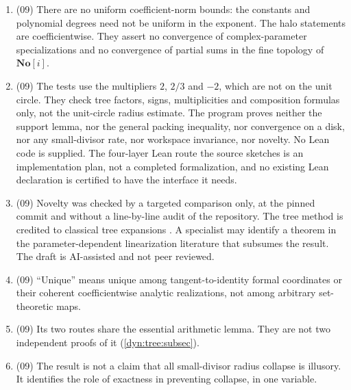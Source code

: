 \documentclass[11pt,letterpaper]{article}
\theoremstyle{definition}
\theoremstyle{remark}
\newcommand{\No}{\mathbf{No}}
\numberwithin{equation}{section}
\begin{document}
\begin{enumerate}[label=\textbf{N\arabic*.},ref=\textbf{N\arabic*},leftmargin=3.2em,start=81]
nonzero complex number is not justified; for a non-Bruno $\lambda$ it
produces a divergent linearizer.
\item (09) There are no uniform coefficient-norm bounds: the constants and
polynomial degrees need not be uniform in the exponent. The halo statements
are coefficientwise. They assert no convergence of complex-parameter
specializations and no convergence of partial sums in the fine topology of
$\No[i]$.
\item (09) The tests use the multipliers $2$, $2/3$ and $-2$, which are not
on the unit circle. They check tree factors, signs, multiplicities and
composition formulas only, not the unit-circle radius estimate. The program
proves neither the support lemma, nor the general packing inequality, nor
convergence on a disk, nor any small-divisor rate, nor workspace
invariance, nor novelty. No Lean code is supplied. The four-layer Lean route
the source sketches is an implementation plan, not a completed
formalization, and no existing Lean declaration is certified to have the
interface it needs.
\item\label{dyn:esm:nc:priority09} (09) Novelty was checked by a targeted
comparison only, at the pinned commit and without a line-by-line audit of
the repository. The tree method is credited to classical tree expansions
\cite{FauvetMenousSauzin,FMS26}. A specialist may identify a theorem in the
parameter-dependent linearization literature that subsumes the result. The
draft is AI-assisted and not peer reviewed.
\item (09) ``Unique'' means unique among tangent-to-identity formal
coordinates or their coherent coefficientwise analytic realizations, not
among arbitrary set-theoretic maps.
\item\label{dyn:esm:nc:routes} (09) Its two routes share the essential
arithmetic lemma. They are not two independent proofs of it
(\cref{dyn:tree:subsec}).
\item (09) The result is not a claim that all small-divisor radius collapse
is illusory. It identifies the role of exactness in preventing collapse, in
one variable.
\end{enumerate}
\end{document}
